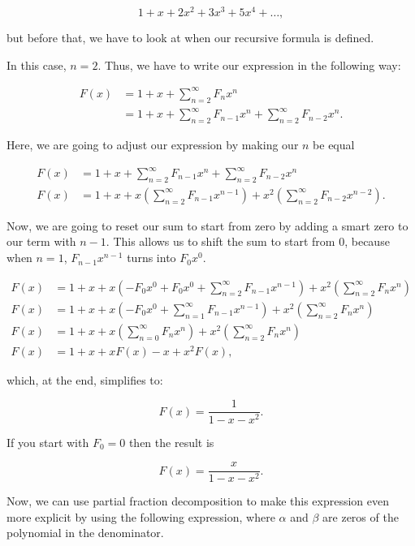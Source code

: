 \[
    1 + x + 2x^2 + 3x^3 + 5x^4 + \dots,
\]

but before that, we have to look at when our recursive formula is defined.

In this case, \(n = 2\). Thus, we have to write our expression in the following way:

\begin{align*}
    F(x) &= 1 + x + \sum_{n = 2}^{\infty} F_n x^{n}\\
    &= 1 + x + \sum_{n = 2}^{\infty} F_{n -1} x^{n} + \sum_{n = 2}^{\infty} F_{n - 2}x^n.
\end{align*}

Here, we are going to adjust our expression by making our \(n\) be equal

\begin{align*}
    F(x) &= 1 + x + \sum_{n = 2}^{\infty} F_{n -1} x^{n} + \sum_{n = 2}^{\infty} F_{n - 2}x^n \\ 
    F(x) &= 1 + x + x \left( \sum_{n = 2}^{\infty} F_{n -1} x^{n-1}\right) + x^2 \left( \sum_{n = 2}^{\infty} F_{n -2} x^{n-2}\right).
\end{align*}

Now, we are going to reset our sum to start from zero by adding a smart zero to our term with 
\(n - 1\). This allows us to shift the sum to start from 0, because when \(n = 1\), 
\(F_{n - 1}x^{n - 1}\) turns into \(F_0 x^0\).

\begin{align*}
    F(x) &= 1 + x + x \left( -F_{0}x^0 + F_{0}x^0 + \sum_{n = 2}^{\infty} F_{n-1} x^{n-1}\right) + x^2 \left( \sum_{n = 2}^{\infty} F_{n} x^{n}\right)\\
    F(x) &= 1 + x + x \left( -F_{0}x^0 + \sum_{n = 1}^{\infty} F_{n-1} x^{n-1}\right) + x^2 \left( \sum_{n = 2}^{\infty} F_{n} x^{n}\right)\\
    F(x) &= 1 + x + x \left( \sum_{n = 0}^{\infty} F_{n} x^{n}\right) + x^2 \left( \sum_{n = 2}^{\infty} F_{n} x^{n}\right)\\
    F(x) &= 1 + x + x F(x) - x + x^2 F(x),
\end{align*}

which, at the end, simplifies to:

\[
    F(x) = \frac{1}{1 - x - x^2}.
\]

If you start with \(F_0 = 0\) then the result is

\[
    F(x) = \frac{x}{1 - x - x^2}.
\]

Now, we can use partial fraction decomposition to make this expression even more explicit
by using the following expression, where \(\alpha\) and \(\beta\) are zeros of the polynomial in the denominator.

